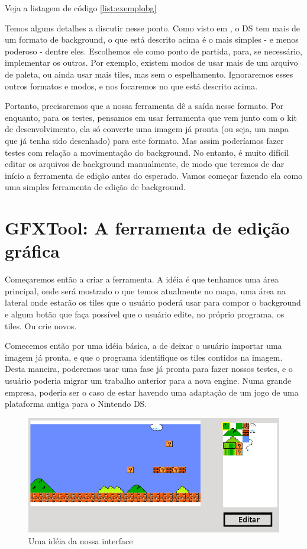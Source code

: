 \documentclass[brazil]{abnt}
\begin{document}
Veja a listagem de código \ref{list:exemplobg}

Temos alguns detalhes a discutir nesse ponto. Como visto em \cite{DSSpec}, o DS tem mais de um formato de background, o que está descrito acima é o mais simples - e menos poderoso - dentre eles. Escolhemos ele como ponto de partida, para, se necessário, implementar os outros. Por exemplo, existem modos de usar mais de um arquivo de paleta, ou ainda usar mais tiles, mas sem o espelhamento. Ignoraremos esses outros formatos e modos, e nos focaremos no que está descrito acima.

Portanto, precisaremos que a nossa ferramenta dê a saída nesse formato. Por enquanto, para os testes, pensamos em usar ferramenta que vem junto com o kit de desenvolvimento, ela só converte uma imagem já pronta (ou seja, um mapa que já tenha sido desenhado) para este formato. Mas assim poderíamos fazer testes com relação a movimentação do background. No entanto, é muito difícil editar os arquivos de background manualmente, de modo que teremos de dar início a ferramenta de edição antes do esperado. Vamos começar fazendo ela como uma simples ferramenta de edição de background.

\section{GFXTool: A ferramenta de edição gráfica}
Começaremos então a criar a ferramenta. A idéia é que tenhamos uma área principal, onde será mostrado o que temos atualmente no mapa, uma área na lateral onde estarão os tiles que o usuário poderá usar para compor o background e algum botão que faça possível que o usuário edite, no próprio programa, os tiles. Ou crie novos.

Comecemos então por uma idéia básica, a de deixar o usuário importar uma imagem já pronta, e que o programa identifique os tiles contidos na imagem. Desta maneira, poderemos usar uma fase já pronta para fazer nossos testes, e o usuário poderia migrar um trabalho anterior para a nova engine. Numa grande empresa, poderia ser o caso de estar havendo uma adaptação de um jogo de uma plataforma antiga para o Nintendo DS.

\begin{figure}[h]
\includegraphics[width=\linewidth]{imgs/mockup.png}
\caption{Uma idéia da nossa interface} 
\end{figure}
\end{document}
